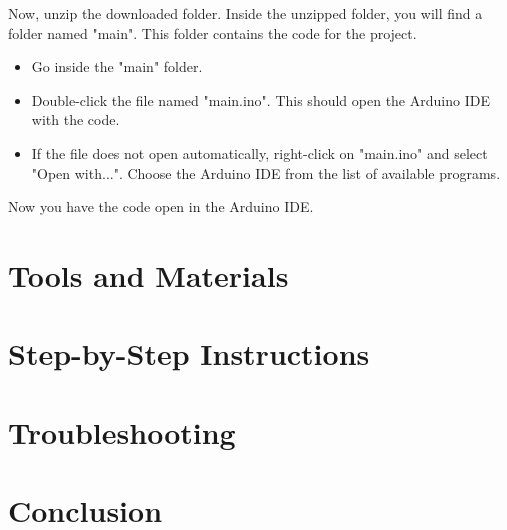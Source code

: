 \documentclass{article}
\begin{document}
Now, unzip the downloaded folder. Inside the unzipped folder, you will find a folder named "main". This folder contains the code for the project.

\begin{itemize}
    \item Go inside the "main" folder.
    \item Double-click the file named "main.ino". This should open the Arduino IDE with the code.
    \item If the file does not open automatically, right-click on "main.ino" and select "Open with...". Choose the Arduino IDE from the list of available programs.
\end{itemize}

Now you have the code open in the Arduino IDE.

\section{Tools and Materials}

\section{Step-by-Step Instructions}

\section{Troubleshooting}

\section{Conclusion}
\end{document}
